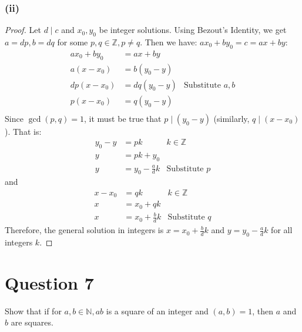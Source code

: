 \documentclass[13pt]{article}
\begin{document}
\subsubsection*{(ii)}
\begin{proof}
  Let $d \mid c$ and $x_0, y_0$ be integer solutions. Using Bezout's Identity, we get $a = dp, b =
  dq$ for some $p, q \in \mathbb{Z}, p \neq q$. Then we have: $ax_0 + by_0 = c = ax + by$:
  \begin{align*}
    ax_0 + by_0 &= ax + by \\
    a(x - x_0) &= b(y_0 - y) \\
    dp(x - x_0) &= dq(y_0 - y) & \text{Substitute } a, b \\
    p(x - x_0) &= q(y_0 - y) \\
  \end{align*}
  Since $\gcd(p, q) = 1$, it must be true that $p \mid (y_0 - y)$ (similarly, $q \mid (x - x_0)$). That is:
  \begin{align*}
    y_0 - y &= pk & k \in \mathbb{Z} \\
    y &= pk + y_0 \\
    y &= y_0 - \frac{a}{d}k & \text{Substitute } p
  \end{align*}
  and
  \begin{align*}
    x - x_0 &= qk & k \in \mathbb{Z} \\
    x &= x_0 + qk \\
    x &= x_0 + \frac{b}{d}k & \text{Substitute } q
  \end{align*}
  Therefore, the general solution in integers is $x = x_0 + \frac{b}{d}k$ and $y = y_0 -
  \frac{a}{d}k$ for all integers $k$.


\end{proof}




\newpage
\section*{Question 7}
Show that if for $a, b \in \mathbb{N}, ab$ is a square of an integer and $(a, b) = 1$, then $a$ and
$b$ are squares.
\end{document}
